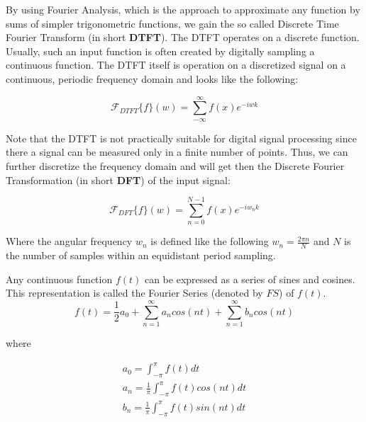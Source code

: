 By using Fourier Analysis, which is the approach to approximate any function by sums of simpler trigonometric functions, we gain the so called Discrete Time Fourier Transform (in short \textbf{DTFT}). The DTFT operates on a discrete function. Usually, such an input function is often created by digitally sampling a continuous function. The DTFT itself is operation on a discretized signal on a continuous, periodic frequency domain and looks like the following:

\begin{equation}
  \mathcal{F}_{DTFT}\{f\}(w) = \sum_{-\infty}^{\infty} f(x) e^{-iwk}
  \label{eq:dtft}
\end{equation}

Note that the DTFT is not practically suitable for digital signal processing since there a signal can be measured only in a finite number of points. Thus, we can further discretize the frequency domain and will get then the Discrete Fourier Transformation (in short \textbf{DFT}) of the input signal:

\begin{equation}
  \mathcal{F}_{DFT}\{f\}(w) = \sum_{n=0}^{N-1} f(x) e^{-iw_{n}k}
  \label{eq:dft}
\end{equation}

Where the angular frequency $w_n$ is defined like the following $w_n = \frac{2\pi n}{N}$ and $N$ is the number of samples within an equidistant period sampling.

Any continuous function $f(t)$ can be expressed as a series of sines and cosines. This representation is called the Fourier Series (denoted by $FS$) of $f(t)$.
\begin{equation}
  f(t) = \frac{1}{2}a_0 + \sum_{n=1}^{\infty} a_n cos(nt) + \sum_{n=1}^{\infty} b_n cos(nt)
  \label{eq:dfs}
\end{equation}

where

\begin{align}
    a_0 = \int_{-\pi}^{\pi} f(t) dt \nonumber \\
    a_n = \frac{1}{\pi}\int_{-\pi}^{\pi} f(t) cos(nt) dt \nonumber \\
    b_n = \frac{1}{\pi}\int_{-\pi}^{\pi} f(t) sin(nt) dt
\end{align}

